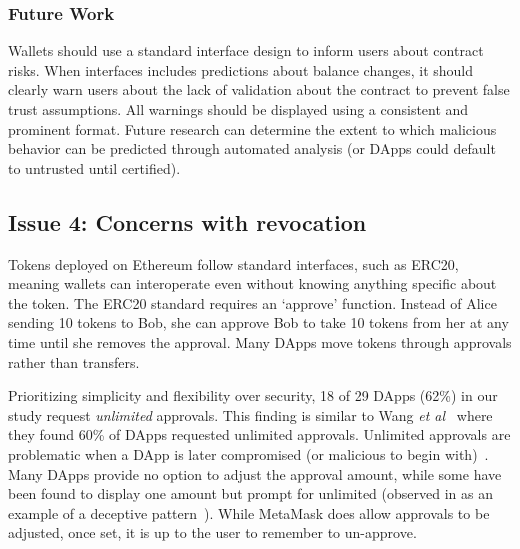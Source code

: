 \documentclass[conference]{IEEEtran}
\begin{document}
\subsubsection*{\textbf{Future Work}}
Wallets should use a standard interface design to inform users about contract risks.
When interfaces includes predictions about balance changes, it should clearly warn users about the lack of validation about the contract to prevent false trust assumptions.
All warnings should be displayed using a consistent and prominent format.
Future research can determine the extent to which malicious behavior can be predicted through automated analysis (or DApps could default to untrusted until certified). 


\subsection{Issue 4: Concerns with revocation}
Tokens deployed on Ethereum follow standard interfaces, such as ERC20, meaning wallets can interoperate even without knowing anything specific about the token.
The ERC20 standard requires an `approve' function. Instead of Alice sending 10 tokens to Bob, she can approve Bob to take 10 tokens from her at any time until she removes the approval. 
Many DApps move tokens through approvals rather than transfers.

Prioritizing simplicity and flexibility over security, 18 of 29 DApps (62\%) in our study request \textit{unlimited} approvals. %
This finding is similar to Wang \textit{et al}~\cite{wang2022penny} where they found 60\% of DApps requested unlimited approvals.
Unlimited approvals are problematic when a DApp is later compromised (or malicious to begin with)~\cite{incident2020Bancor,incident2021Primitive}.
Many DApps provide no option to adjust the approval amount, while some have been found to display one amount but prompt for unlimited (observed in \cite{wang2022penny} as an example of a deceptive pattern~\cite{mathur2019dark}). While MetaMask does allow approvals to be adjusted, once set, it is up to the user to remember to un-approve.  
\end{document}

